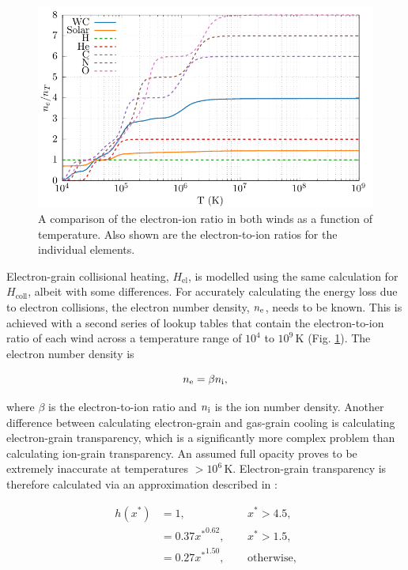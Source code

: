 \begin{figure}
  \centering
  \includegraphics{assets/ionisation-fraction/ionisation-fraction.pdf}
  \caption[OB and WR electron-ion ratios]{A comparison of the electron-ion ratio in both winds as a function of temperature. Also shown are the electron-to-ion ratios for the individual elements.}
  \label{fig:electron-curve}
\end{figure}

Electron-grain collisional heating, $H_\text{el}$, is modelled using the same calculation for $H_\text{coll}$, albeit with some differences.
For accurately calculating the energy loss due to electron collisions, the electron number density, $n_\text{e}$, needs to be known.
This is achieved with a second series of lookup tables that contain the electron-to-ion ratio of each wind across a temperature range of $10^4$ to $10^9\,\si{\kelvin}$ (Fig. \ref{fig:electron-curve}).
The electron number density is 

\begin{equation}
  \label{eq:electronionratio}
  n _\text{e} = \beta n _\text{i} ,
\end{equation}

\noindent
where $\beta$ is the electron-to-ion ratio and $n _\text{i}$ is the ion number density.
Another difference between calculating electron-grain and gas-grain cooling is calculating electron-grain transparency, which is a significantly more complex problem than calculating ion-grain transparency.
An assumed full opacity proves to be extremely inaccurate at temperatures $>10^6\,\si{\kelvin}$.
Electron-grain transparency is therefore calculated via an approximation described in \textcite{dwek_infrared_1981}:

\begin{equation}
  \begin{alignedat}{3}
    h(x^*) & = 1 ,                && ~~ x^* > 4.5, \\
           & = 0.37{x^*}^{0.62} , && ~~ x^* > 1.5 , \\
           & = 0.27{x^*}^{1.50} , && ~~ \text{otherwise,}
  \end{alignedat}
\end{equation}


